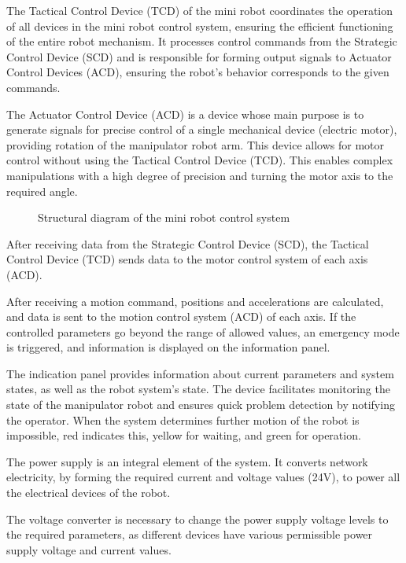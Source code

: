 The Tactical Control Device (TCD) of the mini robot coordinates the operation of all devices in the mini robot control system, ensuring the efficient functioning of the entire robot mechanism. It processes control commands from the Strategic Control Device (SCD) and is responsible for forming output signals to Actuator Control Devices (ACD), ensuring the robot's behavior corresponds to the given commands.



The Actuator Control Device (ACD) is a device whose main purpose is to generate signals for precise control of a single mechanical device (electric motor), providing rotation of the manipulator robot arm. This device allows for motor control without using the Tactical Control Device (TCD). This enables complex manipulations with a high degree of precision and turning the motor axis to the required angle.
\begin{figure}[H]
	\centering
	
	\caption{Structural diagram of the mini robot control system}
	\label{Structural}
\end{figure}
After receiving data from the Strategic Control Device (SCD), the Tactical Control Device (TCD) sends data to the motor control system of each axis (ACD).

After receiving a motion command, positions and accelerations are calculated, and data is sent to the motion control system (ACD) of each axis. If the controlled parameters go beyond the range of allowed values, an emergency mode is triggered, and information is displayed on the information panel.

The indication panel provides information about current parameters and system states, as well as the robot system's state. The device facilitates monitoring the state of the manipulator robot and ensures quick problem detection by notifying the operator. When the system determines further motion of the robot is impossible, red indicates this, yellow for waiting, and green for operation.

The power supply is an integral element of the system. It converts network electricity, by forming the required current and voltage values (24V), to power all the electrical devices of the robot.

The voltage converter is necessary to change the power supply voltage levels to the required parameters, as different devices have various permissible power supply voltage and current values.

